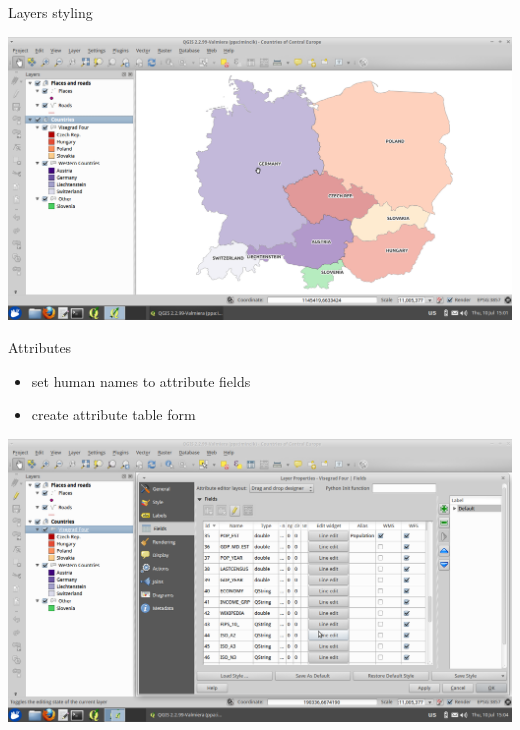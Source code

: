 \documentclass[12pt]{beamer}
\begin{document}
\begin{frame}{Layers styling}
	\begin{center}
		\includegraphics[keepaspectratio=true,height=0.6\textheight]{images/rapid-gis-deployment/project-layer-style-ready.png}
	\end{center}
\end{frame}


\begin{frame}{Attributes}
	\begin{itemize}
		\item set human names to attribute fields
		\item create attribute table form
	\end{itemize}
	\begin{center}
		\includegraphics[keepaspectratio=true,height=0.6\textheight]{images/rapid-gis-deployment/project-layer-attributes.png}
	\end{center}
\end{frame}
\end{document}
